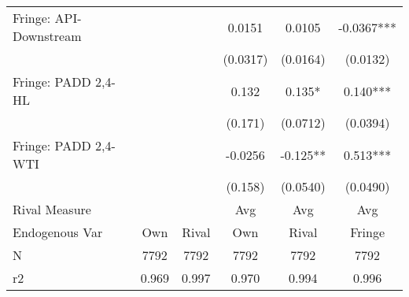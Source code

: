 {\begin{tabular}{l*{5}{c}}
\addlinespace
Fringe: API-Downstream&            &            &   0.0151   &   0.0105   &  -0.0367***\\
                &            &            & (0.0317)   & (0.0164)   & (0.0132)   \\
\addlinespace
Fringe: PADD 2,4-HL&            &            &    0.132   &    0.135*  &    0.140***\\
                &            &            &  (0.171)   & (0.0712)   & (0.0394)   \\
\addlinespace
Fringe: PADD 2,4-WTI&            &            &  -0.0256   &   -0.125** &    0.513***\\
                &            &            &  (0.158)   & (0.0540)   & (0.0490)   \\
\midrule
Rival Measure   &            &            &      Avg   &      Avg   &      Avg   \\
Endogenous Var  &      Own   &    Rival   &      Own   &    Rival   &   Fringe   \\
N               &     7792   &     7792   &     7792   &     7792   &     7792   \\
r2              &    0.969   &    0.997   &    0.970   &    0.994   &    0.996   \\
\bottomrule
\end{tabular}
}
